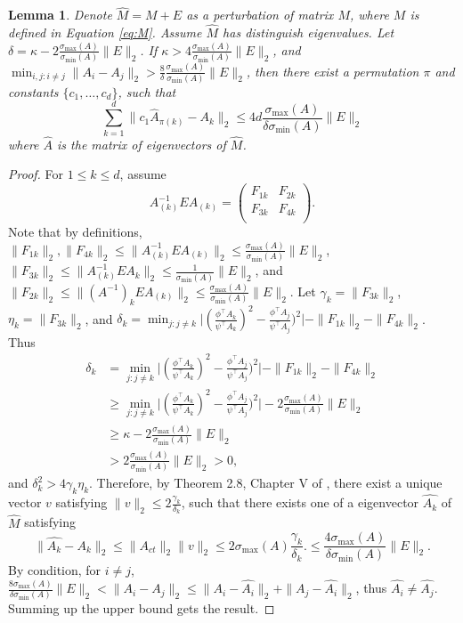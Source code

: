 \documentclass[english]{article} %
\providecommand{\lemmaname}{Lemma}
\theoremstyle{plain}
\newtheorem{lemma}[thm]{\protect\lemmaname}
\theoremstyle{definition}
\theoremstyle{remark}
\begin{document}
\begin{lemma}
\label{lem:eigenvectorvariation}
Denote $\widehat{M} = M+E$ as a perturbation of matrix $M$, where $M$ is defined in Equation \eqref{eq:M}. 
Assume $\widehat{M}$ has distinguish eigenvalues. Let $\delta = \kappa -  2 \frac{\sigma_{\max}(A)}{\sigma_{\min}(A)}\|E\|_2$. 
If $\kappa > 4 \frac{\sigma_{\max}(A)}{\sigma_{\min}(A)}\|E\|_2$, and $\min_{i,j:i\neq j} \|A_i - A_j\|_2 > \frac{8}{\delta}\frac{\sigma_{\max}(A)}{\sigma_{\min}(A) } \|E\|_2$, then there exist a permutation $\pi$ and constants $\{c_1,\ldots,c_d\}$, such that 
\[
\sum_{k=1}^{d}\| c_1\widehat{A}_{\pi(k)} - A_k\|_2 \le 4d  \frac{\sigma_{\max}(A)}{\delta \sigma_{\min}(A) } \|E\|_2
\]
where $\widehat{A}$ is the matrix of eigenvectors of $\widehat{M}$. 
\end{lemma}

\begin{proof}
For $1\le k\le d$, assume 
\[
A_{(k)}^{-1} E A_{(k)} =  
\left(
\begin{array}{cc}
F_{1k} & F_{2k}\\
F_{3k} & F_{4k} \\
\end{array} 
\right). 
\] 
Note that by definitions, $\|F_{1k}\|_2,\|F_{4k}\|_2\le\|A_{(k)}^{-1} E A_{(k)}\|_2\le\frac{\sigma_{\max}(A)}{\sigma_{\min}(A)}\|E\|_2$,
 $\|F_{3k}\|_2\le\|A_{(k)}^{-1}EA_{k}\|_2\le\frac{1}{\sigma_{\min}(A)}\|E\|_2$,
 and $\|F_{2k}\|_2\le\|(A^{-1})_kEA_{(k)}\|_2\le\frac{\sigma_{\max}(A)}{\sigma_{\min}(A)}\|E\|_2$.
Let $\gamma_k = \|F_{3k}\|_2$, $\eta_k = \|F_{3k}\|_2$, and $\delta_k = \min_{j: j\neq k} \vert (\frac{\phi^{\top}A_k}{\psi^{\top}A_k})^2 - \frac{\phi^{\top}A_j}{\psi^{\top}A_j})^2 \vert - \|F_{1k}\|_2 - \|F_{4k}\|_2$. Thus 
\begin{align*}
\delta_k & = \min_{j:j\neq k} \vert (\frac{\phi^{\top}A_k}{\psi^{\top}A_k})^2 - \frac{\phi^{\top}A_j}{\psi^{\top}A_j})^2 \vert - \|F_{1k}\|_2 - \|F_{4k}\|_2\\
	& \ge \min_{j:j\neq k} \vert (\frac{\phi^{\top}A_k}{\psi^{\top}A_k})^2 - \frac{\phi^{\top}A_j}{\psi^{\top}A_j})^2 \vert - 2 \frac{\sigma_{\max}(A)}{\sigma_{\min}(A)}\|E\|_2\\
	& \ge  \kappa -  2 \frac{\sigma_{\max}(A)}{\sigma_{\min}(A)}\|E\|_2\\
	& >  2 \frac{\sigma_{\max}(A)}{\sigma_{\min}(A)}\|E\|_2 >0,
\end{align*}
and $\delta_k^2 > 4\gamma_k\eta_k$. 
Therefore, by Theorem 2.8, Chapter V of \citep{stewart1990matrix}, there exist a unique vector $v$ satisfying $\|v\|_2\le 2\frac{\gamma_k}{\delta_k}$, such that there exists one of a eigenvector $\widehat{A_k}$ of $\widehat{M}$ satisfying
 \[
 \|\widehat{A_k} - A_k\|_2 \le \|A_{ct}\|_2 \|v\|_2 \le 2\sigma_{\max}(A)\frac{\gamma_k}{\delta_k}.\le \frac{4\sigma_{\max}(A)}{\delta \sigma_{\min}(A) } \|E\|_2.
 \]
 By condition, for $i\neq j$,  $\frac{8\sigma_{\max}(A)}{\delta \sigma_{\min}(A) } \|E\|_2 < \|A_i - A_j\|_2\le \|A_i - \widehat{A_i}\|_2 + \|A_j - \widehat{A_i}\|_2$, thus $\widehat{A_i} \neq \widehat{A_j}$.  Summing up the upper bound gets the result. 
\end{proof}
\end{document}
